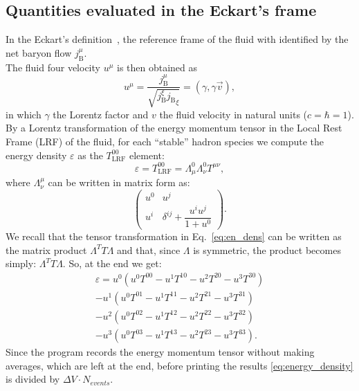 \documentclass[12pt, a4paper]{article}
\begin{document}
\subsection{Quantities evaluated in the Eckart's frame}

In the Eckart's definition~\cite{Eckart:1940te}, the reference frame of the fluid with identified by the net baryon flow $j^{\mu}_{\mathrm{B}}$.\\
The fluid four velocity $u^{\mu}$ is then obtained as
\begin{equation}
u^{\mu}=\dfrac{j^{\mu}_{\mathrm{B}}}{\sqrt{j^{\xi}_{\mathrm{B}}{j_{\mathrm{B}}}_\xi}}=(\gamma,\gamma \vec{v}),
\label{eq:fluid_vel}
\end{equation}
in which $\gamma$ the Lorentz factor and $v$ the fluid velocity in natural units ($c=\hbar=1$).\\
By a Lorentz transformation of the energy momentum tensor in the Local Rest Frame (LRF) of the fluid, for each ``stable'' hadron species we compute the energy density $ \varepsilon$ as the $T^{00}_{\mathrm{LRF}}$ element:
\begin{equation} 
\varepsilon = T^{00}_{\mathrm{LRF}} = \Lambda^0_{\mu}\Lambda^0_{\nu}T^{\mu\nu},
\label{eq:en_dens}
\end{equation} 
where $\Lambda^{\mu}_{\nu}$ can be written in matrix form as:
\begin{equation}
\begin{pmatrix}
	u^0 & u^j\\
	u^i & \delta^{ij}+\dfrac{u^i u^j}{1 + u^0}
\end{pmatrix}.
\label{eq:boost_matrix_short}
\end{equation}
We recall that the tensor transformation in Eq.~\ref{eq:en_dens} can be written as the matrix product $\Lambda^{T} T \Lambda$ and that, since $\Lambda$ is symmetric, the product becomes simply: $\Lambda^{T} T \Lambda$. So, at the end we get:
\begin{equation}
\begin{split}
\varepsilon=u^0(u^0 T^{00} - u^1 T^{10} - u^2 T^{20} - u^3 T^{30})\\ 
- u^1 (u^0 T^{01} - u^1 T^{11} - u^2 T^{21} - u^3 T^{31})\\
- u^2 (u^0 T^{02} - u^1 T^{12} - u^2 T^{22} - u^3 T^{32})\\
- u^3 (u^0 T^{03} - u^1 T^{13} - u^2 T^{23} - u^3 T^{33}).
\end{split}
\label{eq:energy_density}
\end{equation}
Since the program records the energy momentum tensor without making averages, which are left at the end, before printing the results \ref{eq:energy_density} is divided by $\Delta V \cdot N_{events}$.\\
\end{document}
